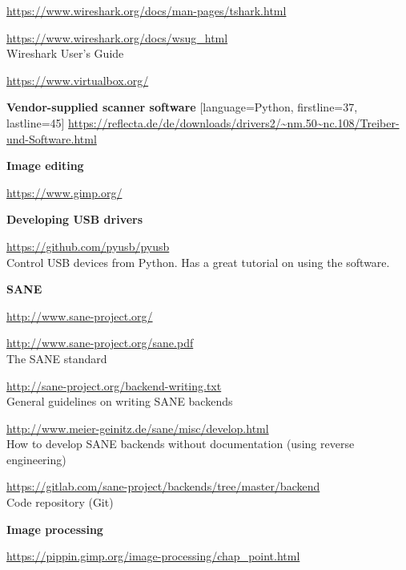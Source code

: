 \documentclass{article}
\begin{document}
\begin{thebibliography}{}
  \url{https://www.wireshark.org/docs/man-pages/tshark.html}
  
  \url{https://www.wireshark.org/docs/wsug_html} \\
  Wireshark User's Guide

  \url{https://www.virtualbox.org/}

  \item[]\hspace{-\labelwidth}\hspace{-\labelsep}\textbf{Vendor-supplied scanner software}
[language=Python, firstline=37, lastline=45]
  \url{https://reflecta.de/de/downloads/drivers2/~nm.50~nc.108/Treiber-und-Software.html}

  \item[]\hspace{-\labelwidth}\hspace{-\labelsep}\textbf{Image editing}

  \url{https://www.gimp.org/}

  \item[]\hspace{-\labelwidth}\hspace{-\labelsep}\textbf{Developing USB drivers}

  \url{https://github.com/pyusb/pyusb} \\
  Control USB devices from Python. Has a great tutorial on using the software.
  
  \item[]\hspace{-\labelwidth}\hspace{-\labelsep}\textbf{SANE}
  
  \url{http://www.sane-project.org/}
  
  \url{http://www.sane-project.org/sane.pdf} \\
  The SANE standard
  
  \url{http://sane-project.org/backend-writing.txt} \\
  General guidelines on writing SANE backends
  
  \url{http://www.meier-geinitz.de/sane/misc/develop.html} \\
  How to develop SANE backends without documentation (using reverse engineering)
  
  \url{https://gitlab.com/sane-project/backends/tree/master/backend} \\
  Code repository (Git)
  
  \item[]\hspace{-\labelwidth}\hspace{-\labelsep}\textbf{Image processing}
  
  \url{https://pippin.gimp.org/image-processing/chap_point.html}
\end{thebibliography}
\end{document}
